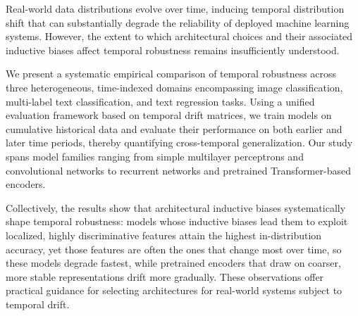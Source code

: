 Real-world data distributions evolve over time, inducing temporal distribution shift that can substantially degrade the reliability of deployed machine learning systems. However, the extent to which architectural choices and their associated inductive biases affect temporal robustness remains insufficiently understood.

We present a systematic empirical comparison of temporal robustness across three heterogeneous, time-indexed domains encompassing image classification, multi-label text classification, and text regression tasks. Using a unified evaluation framework based on temporal drift matrices, we train models on cumulative historical data and evaluate their performance on both earlier and later time periods, thereby quantifying cross-temporal generalization. Our study spans model families ranging from simple multilayer perceptrons and convolutional networks to recurrent networks and pretrained Transformer-based encoders.

Collectively, the results show that architectural inductive biases systematically shape temporal robustness: models whose inductive biases lead them to exploit localized, highly discriminative features attain the highest in-distribution accuracy, yet those features are often the ones that change most over time, so these models degrade fastest, while pretrained encoders that draw on coarser, more stable representations drift more gradually. These observations offer practical guidance for selecting architectures for real-world systems subject to temporal drift.
